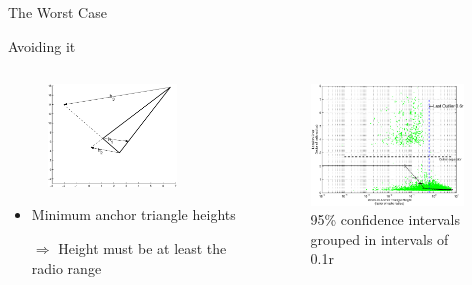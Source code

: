 \documentclass{beamer}
\begin{document}
\begin{frame}{The Worst Case}
\begin{block}{Avoiding it}
\begin{columns}
	\begin{column}[T]{0.3\textwidth}
		\begin{figure}
		  \centering
			\includegraphics[width=0.8\textwidth]{SampleHeights}
		\end{figure}	
		\begin{itemize}
			\item Minimum anchor triangle heights
			\item[$\Rightarrow$] Height must be at least the radio range
		\end{itemize}
		\vfill
	\end{column}
	\begin{column}[T]{0.7\textwidth}
		\begin{figure}
			  \centering
				\includegraphics[width=0.95\textwidth]{HeightIndicator_square}
				\caption{95\% confidence intervals grouped in intervals of 0.1r}	
		\end{figure}
	\end{column}
\end{columns}
\end{block}
\end{frame}
\end{document}
